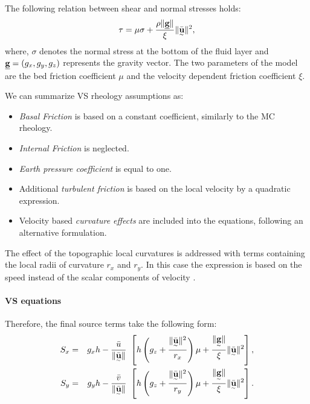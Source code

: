 \documentclass{article}
\begin{document}
The following relation between shear and normal stresses holds:
\begin{equation}
\tau = \mu \sigma + \frac{\rho \| \underline{\textbf g} \|}{\xi} \| \underset{^\sim}{\bar{\textbf u}} \|^2,
\end{equation}
where, $\sigma$ denotes the normal stress at the bottom of the fluid layer and $\underline{\textbf g} = (g_{x} , g_{y} , g_{z})$ represents the gravity vector. The two parameters of the model are the bed friction coefficient $\mu$ and the velocity dependent friction coefficient $\xi$.

We can summarize VS rheology assumptions as:
\begin{itemize}
\item \textit{Basal Friction} is based on a constant coefficient, similarly to the MC rheology.

\item \textit{Internal Friction} is neglected.

\item \textit{Earth pressure coefficient} is equal to one.

\item Additional \textit{turbulent friction} is based on the local velocity by a quadratic expression.

\item Velocity based \textit{curvature effects} are included into the equations, following an alternative formulation.
\end{itemize}

The effect of the topographic local curvatures is addressed with terms containing the local radii of curvature $r_x$ and $r_y$. In this case the expression is based on the speed instead of the scalar components of velocity \cite{PudasainiHutter2003,Fischer2012}.

\paragraph{VS equations} Therefore, the final source terms take the following form:
\begin{eqnarray}
\label{eq:S_terms_VS}
S_{x} &=&  g_{x} h - \frac{\bar{u}}{\| \underset{^\sim}{\bar{\textbf u}}\|} \ \left[ h \left(g_{z} + \frac{\| \underset{^\sim}{\bar{\textbf u}} \|^2}{r_{x}} \right)\mu+ \frac{\| \underset{^\sim}{\textbf g} \|}{\xi}\| \underset{^\sim}{\bar{\textbf u}} \|^2\right], \nonumber \\
S_{y} &=& g_{y} h - \frac{\bar{v}}{\| \underset{^\sim}{\bar{\textbf u}}\|} \ \left[ h \left(g_{z} + \frac{\| \underset{^\sim}{\bar{\textbf u}} \|^2}{r_{y}} \right)\mu+ \frac{\| \underset{^\sim}{\textbf g} \|}{\xi}\| \underset{^\sim}{\bar{\textbf u}} \|^2\right].
\end{eqnarray}
\end{document}
